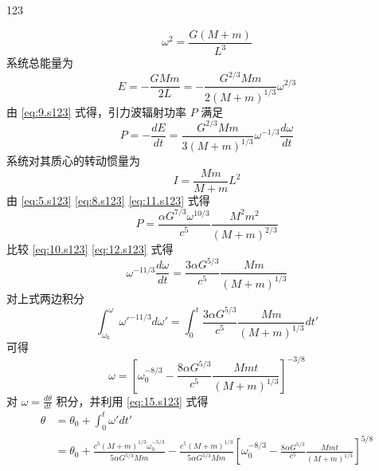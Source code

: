 \begin{solution}{123}
\begin{subsolution}
\begin{equation}
            \omega^{2} = \frac{G (M + m)}{L^{3}}
            \label{eq:8.s123}
        \end{equation}
        系统总能量为
        \begin{equation}
            E = -\frac{G M m}{2 L} = -\frac{G^{2/3} M m}{2 (M + m)^{1/3}} \omega^{2/3}
            \label{eq:9.s123}
        \end{equation}
        由 \eqref{eq:9.s123} 式得，引力波辐射功率 $P$ 满足
        \begin{equation}
            P = -\frac{dE}{dt} = \frac{G^{2/3} M m}{3 (M + m)^{1/3}} \omega^{-1/3} \frac{d\omega}{dt}
            \label{eq:10.s123}
        \end{equation}
        系统对其质心的转动惯量为
        \begin{equation}
            I = \frac{M m}{M + m} L^{2}
            \label{eq:11.s123}
        \end{equation}
        由 \eqref{eq:5.s123} \eqref{eq:8.s123} \eqref{eq:11.s123} 式得
        \begin{equation}
            P = \frac{\alpha G^{7/3} \omega^{10/3}}{c^{5}} \frac{M^{2} m^{2}}{(M + m)^{2/3}}
            \label{eq:12.s123}
        \end{equation}
        比较 \eqref{eq:10.s123} \eqref{eq:12.s123} 式得
        \begin{equation}
            \omega^{-11/3} \frac{d\omega}{dt} = \frac{3 \alpha G^{5/3}}{c^{5}} \frac{M m}{(M + m)^{1/3}}
            \label{eq:14.s123}
        \end{equation}
        对上式两边积分
        \begin{equation}
            \int_{\omega_{0}}^{\omega} \omega'^{-11/3} d\omega' = \int_{0}^{t} \frac{3 \alpha G^{5/3}}{c^{5}} \frac{M m}{(M + m)^{1/3}} dt'
            \label{eq:13.s123}
        \end{equation}
        可得
        \begin{equation}
            \omega = \left[ \omega_{0}^{-8/3} - \frac{8 \alpha G^{5/3}}{c^{5}} \frac{M m t}{(M + m)^{1/3}} \right]^{-3/8}
            \label{eq:15.s123}
        \end{equation}
        对 $\omega = \frac{d\theta}{dt}$ 积分，并利用 \eqref{eq:15.s123} 式得
        \begin{align}
            \theta &= \theta_{0} + \int_{0}^{t} \omega' dt' \nonumber \\
            &= \theta_{0} + \frac{c^{5} (M + m)^{1/3} \omega_{0}^{-5/3}}{5 \alpha G^{5/3} M m} - \frac{c^{5} (M + m)^{1/3}}{5 \alpha G^{5/3} M m} \left[ \omega_{0}^{-8/3} - \frac{8 \alpha G^{5/3}}{c^{5}} \frac{M m t}{(M + m)^{1/3}} \right]^{5/8}

\end{align}
\end{subsolution}
\end{solution}
